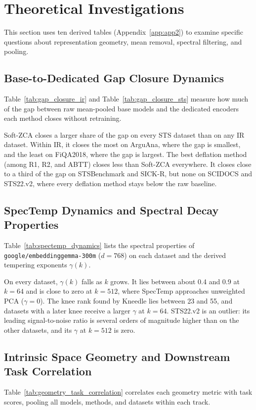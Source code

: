 \section{Theoretical Investigations}
\label{sec:theoretical_analysis}

This section uses ten derived tables (Appendix~\ref{app:app2}) to examine specific questions about representation geometry, mean removal, spectral filtering, and pooling.

\subsection{Base-to-Dedicated Gap Closure Dynamics}
Table~\ref{tab:gap_closure_ir} and Table~\ref{tab:gap_closure_sts} measure how much of the gap between raw mean-pooled base models and the dedicated encoders each method closes without retraining.

Soft-ZCA closes a larger share of the gap on every STS dataset than on any IR dataset. Within IR, it closes the most on ArguAna, where the gap is smallest, and the least on FiQA2018, where the gap is largest. The best deflation method (among R1, R2, and ABTT) closes less than Soft-ZCA everywhere. It closes close to a third of the gap on STSBenchmark and SICK-R, but none on SCIDOCS and STS22.v2, where every deflation method stays below the raw baseline.

\subsection{SpecTemp Dynamics and Spectral Decay Properties}
Table~\ref{tab:spectemp_dynamics} lists the spectral properties of \texttt{google/embeddinggemma-300m} ($d=768$) on each dataset and the derived tempering exponents $\gamma(k)$.

On every dataset, $\gamma(k)$ falls as $k$ grows. It lies between about 0.4 and 0.9 at $k=64$ and is close to zero at $k=512$, where SpecTemp approaches unweighted PCA ($\gamma = 0$). The knee rank found by Kneedle lies between 23 and 55, and datasets with a later knee receive a larger $\gamma$ at $k=64$. STS22.v2 is an outlier: its leading signal-to-noise ratio is several orders of magnitude higher than on the other datasets, and its $\gamma$ at $k=512$ is zero.

\subsection{Intrinsic Space Geometry and Downstream Task Correlation}
Table~\ref{tab:geometry_task_correlation} correlates each geometry metric with task scores, pooling all models, methods, and datasets within each track.

